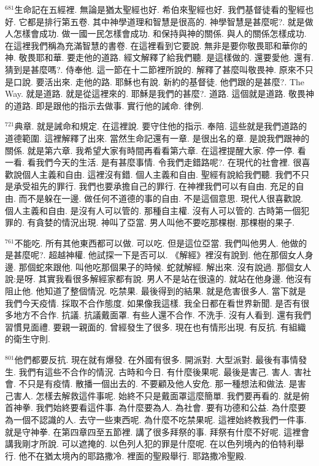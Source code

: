 \documentclass{book}
\begin{document}
$^{681}$生命記在五經裡.
無論是猶太聖經也好.
希伯來聖經也好.
我們基督徒看的聖經也好.
它都是排行第五卷.
其中神學道理和智慧是很高的.
神學智慧是甚麼呢?.
就是做人怎樣會成功.
做一國一民怎樣會成功.
和保持與神的關係.
與人的關係怎樣成功.
在這裡我們稱為充滿智慧的書卷.
在這裡看到它要說.
無非是要你敬畏耶和華你的神.
敬畏耶和華.
要走他的道路.
經文解釋了給我們聽.
是這樣做的.
還要愛他.
還有.
猜到是甚麼嗎?.
侍奉他.
這一節在十二節裡所說的.
解釋了甚麼叫敬畏神.
原來不只是口說.
要活出來.
走他的路.
耶穌也有說.
新約的基督徒.
他們跟的是甚麼?.
The Way.
就是道路.
就是從這裡來的.
耶穌是我們的甚麼?.
道路.
這個就是道路.
敬畏神的道路.
即是跟他的指示去做事.
實行他的誡命.
律例.

$^{721}$典章.
就是誡命和規定.
在這裡說.
要守住他的指示.
奉陪.
這些就是我們道路的道德範圍.
這裡解釋了出來.
當然生命記還有一章.
是很出名的章.
是說我們跟神的關係.
就是第六章.
我希望大家有時間再看看第六章.
在這裡提醒大家.
停一停.
看一看.
看我們今天的生活.
是有甚麼事情.
令我們走錯路呢?.
在現代的社會裡.
很喜歡說個人主義和自由.
這裡沒有錯.
個人主義和自由.
聖經有說給我們聽.
我們不只是承受祖先的罪行.
我們也要承擔自己的罪行.
在神裡我們可以有自由.
充足的自由.
而不是躲在一邊.
做任何不道德的事的自由.
不是這個意思.
現代人很喜歡說.
個人主義和自由.
是沒有人可以管的.
那種自主權.
沒有人可以管的.
古時第一個犯罪的.
有貪婪的情況出現.
神叫了亞當.
男人叫他不要吃那棵樹.
那棵樹的果子.

$^{761}$不能吃.
所有其他東西都可以做.
可以吃.
但是這位亞當.
我們叫他男人.
他做的是甚麼呢?.
超越神權.
他試探一下是否可以.
《解經》裡沒有說到.
他在那個女人身邊.
那個蛇來跟他.
叫他吃那個果子的時候.
蛇就解經.
解出來.
沒有說過.
那個女人說:是呀.
其實我看很多解經家都有說.
男人不是站在很遠的.
就站在他身邊.
他沒有阻止他.
他知道了整個情況.
吃禁果.
最後得到的結果.
就是危害很多人.
當下就是我們今天疫情.
採取不合作態度.
如果像我這樣.
我全日都在看世界新聞.
是否有很多地方不合作.
抗議.
抗議戴面罩.
有些人還不合作.
不洗手.
沒有人看到.
還有我們習慣見面禮.
要親一親面的.
曾經發生了很多.
現在也有情形出現.
有反抗.
有組織的衛生守則.

$^{801}$他們都要反抗.
現在就有爆發.
在外國有很多.
開派對.
大型派對.
最後有事情發生.
我們有這些不合作的情況.
古時和今日.
有什麼後果呢.
最後是害己.
害人.
害社會.
不只是有疫情.
散播一個出去的.
不要顧及他人安危.
那一種想法和做法.
是害己害人.
怎樣去解救這件事呢.
始終不只是戴面罩這麼簡單.
我們要再看的.
就是俯首神拳.
我們始終要看這件事.
為什麼要為人.
為社會.
要有功德和公益.
為什麼要為一個不認識的人.
去守一些東西呢.
為什麼不吃禁果呢.
這裡始終教我們一件事.
就是守神拳.
在第四章四至五節裡.
講了很多拜祭的事.
拜祭有什麼不好呢.
這裡會講我剛才所說.
可以遮掩的.
以色列人犯的罪是什麼呢.
在以色列境內的伯特利舉行.
他不在猶太境內的耶路撒冷.
裡面的聖殿舉行.
耶路撒冷聖殿.
\end{document}
